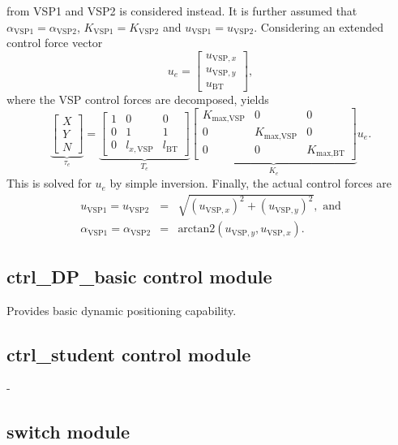 \documentclass[a4paper,twoside,english]{report}
\begin{document}
from VSP1 and VSP2 is considered instead. It is further assumed that
$\alpha_{\text{VSP1}}=\alpha_{\text{VSP2}}$, $K_{\text{VSP1}}=K_{\text{VSP2}}$
and $u_{\text{VSP1}}=u_{\text{VSP2}}$. Considering an extended control
force vector
\[
u_{e}=\left[\begin{array}{c}
u_{\text{VSP},x}\\
u_{\text{VSP},y}\\
u_{\text{BT}}
\end{array}\right],
\]
where the VSP control forces are decomposed, yields
\[
\underbrace{\left[\begin{array}{c}
X\\
Y\\
N
\end{array}\right]}_{\tau_{e}}=\underbrace{\left[\begin{array}{ccc}
1 & 0 & 0\\
0 & 1 & 1\\
0 & l_{x,\text{VSP}} & l_{\text{BT}}
\end{array}\right]}_{T_{e}}\underbrace{\left[\begin{array}{ccc}
K_{\text{max,VSP}} & 0 & 0\\
0 & K_{\text{max,VSP}} & 0\\
0 & 0 & K_{\text{max,BT}}
\end{array}\right]}_{K_{e}}u_{e}.
\]
This is solved for $u_{e}$ by simple inversion. Finally, the actual
control forces are
\begin{eqnarray*}
u_{\text{VSP1}}=u_{\text{VSP2}} & = & \sqrt{\left(u_{\text{VSP},x}\right)^{2}+\left(u_{\text{VSP},y}\right)^{2}},\text{ and}\\
\alpha_{\text{VSP1}}=\alpha_{\text{VSP2}} & = & \text{arctan2}\left(u_{\text{VSP},y},u_{\text{VSP},x}\right).
\end{eqnarray*}


\subsection{ctrl\_DP\_basic control module}

Provides basic dynamic positioning capability.

\subsection{ctrl\_student control module}

-

\subsection{switch module}
\end{document}
